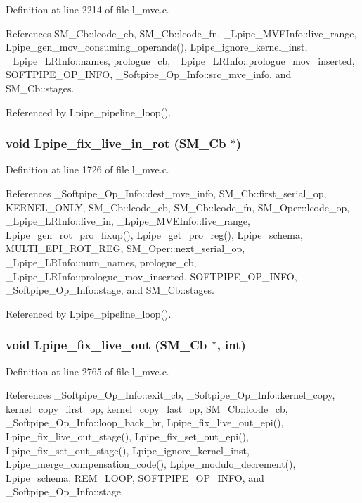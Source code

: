 Definition at line 2214 of file l\_\-mve.c.

References SM\_\-Cb::lcode\_\-cb, SM\_\-Cb::lcode\_\-fn, \_\-Lpipe\_\-MVEInfo::live\_\-range, Lpipe\_\-gen\_\-mov\_\-consuming\_\-operands(), Lpipe\_\-ignore\_\-kernel\_\-inst, \_\-Lpipe\_\-LRInfo::names, prologue\_\-cb, \_\-Lpipe\_\-LRInfo::prologue\_\-mov\_\-inserted, SOFTPIPE\_\-OP\_\-INFO, \_\-Softpipe\_\-Op\_\-Info::src\_\-mve\_\-info, and SM\_\-Cb::stages.

Referenced by Lpipe\_\-pipeline\_\-loop().
\subsubsection{\setlength{\rightskip}{0pt plus 5cm}void Lpipe\_\-fix\_\-live\_\-in\_\-rot (\bf{SM\_\-Cb} $\ast$)}\label{l__mve_8h_26395c5756cc1ff986e4a75ffb6c841d}




Definition at line 1726 of file l\_\-mve.c.

References \_\-Softpipe\_\-Op\_\-Info::dest\_\-mve\_\-info, SM\_\-Cb::first\_\-serial\_\-op, KERNEL\_\-ONLY, SM\_\-Cb::lcode\_\-cb, SM\_\-Cb::lcode\_\-fn, SM\_\-Oper::lcode\_\-op, \_\-Lpipe\_\-LRInfo::live\_\-in, \_\-Lpipe\_\-MVEInfo::live\_\-range, Lpipe\_\-gen\_\-rot\_\-pro\_\-fixup(), Lpipe\_\-get\_\-pro\_\-reg(), Lpipe\_\-schema, MULTI\_\-EPI\_\-ROT\_\-REG, SM\_\-Oper::next\_\-serial\_\-op, \_\-Lpipe\_\-LRInfo::num\_\-names, prologue\_\-cb, \_\-Lpipe\_\-LRInfo::prologue\_\-mov\_\-inserted, SOFTPIPE\_\-OP\_\-INFO, \_\-Softpipe\_\-Op\_\-Info::stage, and SM\_\-Cb::stages.

Referenced by Lpipe\_\-pipeline\_\-loop().
\subsubsection{\setlength{\rightskip}{0pt plus 5cm}void Lpipe\_\-fix\_\-live\_\-out (\bf{SM\_\-Cb} $\ast$, int)}\label{l__mve_8h_0d325bb02fcc4cb8db3c777339617c0c}




Definition at line 2765 of file l\_\-mve.c.

References \_\-Softpipe\_\-Op\_\-Info::exit\_\-cb, \_\-Softpipe\_\-Op\_\-Info::kernel\_\-copy, kernel\_\-copy\_\-first\_\-op, kernel\_\-copy\_\-last\_\-op, SM\_\-Cb::lcode\_\-cb, \_\-Softpipe\_\-Op\_\-Info::loop\_\-back\_\-br, Lpipe\_\-fix\_\-live\_\-out\_\-epi(), Lpipe\_\-fix\_\-live\_\-out\_\-stage(), Lpipe\_\-fix\_\-set\_\-out\_\-epi(), Lpipe\_\-fix\_\-set\_\-out\_\-stage(), Lpipe\_\-ignore\_\-kernel\_\-inst, Lpipe\_\-merge\_\-compensation\_\-code(), Lpipe\_\-modulo\_\-decrement(), Lpipe\_\-schema, REM\_\-LOOP, SOFTPIPE\_\-OP\_\-INFO, and \_\-Softpipe\_\-Op\_\-Info::stage.

